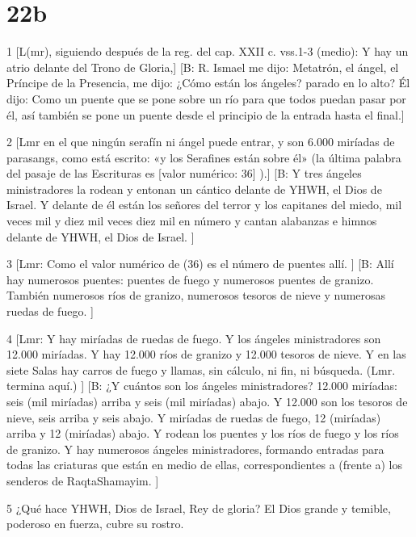 \chapter{22b}

\par 1 [L(mr), siguiendo después de la reg. del cap. XXII c. vss.1-3 (medio): Y hay un atrio delante del Trono de Gloria,] [B: R. Ismael me dijo: Metatrón, el ángel, el Príncipe de la Presencia, me dijo: ¿Cómo están los ángeles? parado en lo alto? Él dijo: Como un puente que se pone sobre un río para que todos puedan pasar por él, así también se pone un puente desde el principio de la entrada hasta el final.]

\par 2 [Lmr en el que ningún serafín ni ángel puede entrar, y son 6.000 miríadas de parasangs, como está escrito: «y los Serafines están sobre él» (la última palabra del pasaje de las Escrituras es [valor numérico: 36] ).] [B: Y tres ángeles ministradores la rodean y entonan un cántico delante de YHWH, el Dios de Israel. Y delante de él están los señores del terror y los capitanes del miedo, mil veces mil y diez mil veces diez mil en número y cantan alabanzas e himnos delante de YHWH, el Dios de Israel. ]

\par 3 [Lmr: Como el valor numérico de (36) es el número de puentes allí. ] [B: Allí hay numerosos puentes: puentes de fuego y numerosos puentes de granizo. También numerosos ríos de granizo, numerosos tesoros de nieve y numerosas ruedas de fuego. ]

\par 4 [Lmr: Y hay miríadas de ruedas de fuego. Y los ángeles ministradores son 12.000 miríadas. Y hay 12.000 ríos de granizo y 12.000 tesoros de nieve. Y en las siete Salas hay carros de fuego y llamas, sin cálculo, ni fin, ni búsqueda. (Lmr. termina aquí.) ] [B: ¿Y cuántos son los ángeles ministradores? 12.000 miríadas: seis (mil miríadas) arriba y seis (mil miríadas) abajo. Y 12.000 son los tesoros de nieve, seis arriba y seis abajo. Y miríadas de ruedas de fuego, 12 (miríadas) arriba y 12 (miríadas) abajo. Y rodean los puentes y los ríos de fuego y los ríos de granizo. Y hay numerosos ángeles ministradores, formando entradas para todas las criaturas que están en medio de ellas, correspondientes a (frente a) los senderos de RaqtaShamayim. ]

\par 5 ¿Qué hace YHWH, Dios de Israel, Rey de gloria? El Dios grande y temible, poderoso en fuerza, cubre su rostro.

